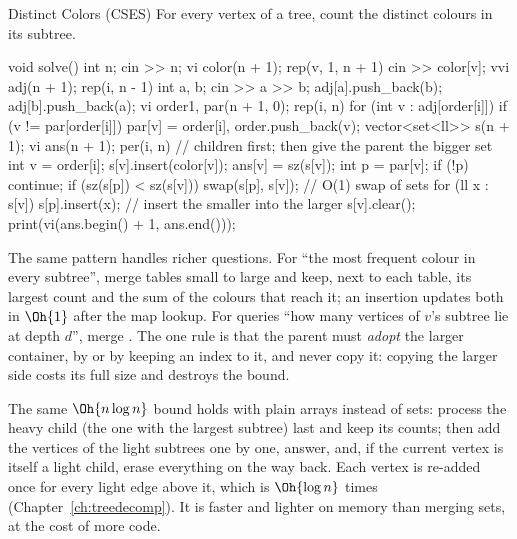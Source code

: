 \begin{problem}{Distinct Colors (CSES)}
For every vertex of a tree, count the distinct colours in its subtree.
\end{problem}

\begin{code}
void solve() {
    int n;
    cin >> n;
    vi color(n + 1);
    rep(v, 1, n + 1) cin >> color[v];
    vvi adj(n + 1);
    rep(i, n - 1) {
        int a, b;
        cin >> a >> b;
        adj[a].push_back(b);
        adj[b].push_back(a);
    }
    vi order{1}, par(n + 1, 0);
    rep(i, n) for (int v : adj[order[i]])
        if (v != par[order[i]]) par[v] = order[i], order.push_back(v);
    vector<set<ll>> s(n + 1);
    vi ans(n + 1);
    per(i, n) {  // children first; then give the parent the bigger set
        int v = order[i];
        s[v].insert(color[v]);
        ans[v] = sz(s[v]);
        int p = par[v];
        if (!p) continue;
        if (sz(s[p]) < sz(s[v])) swap(s[p], s[v]);  // O(1) swap of sets
        for (ll x : s[v]) s[p].insert(x);  // insert the smaller into the larger
        s[v].clear();
    }
    print(vi(ans.begin() + 1, ans.end()));
}
\end{code}


The same pattern handles richer questions. For ``the most frequent colour in every subtree'', merge 
tables small to large and keep, next to each table, its largest count and the sum of the colours that reach it; an insertion
updates both in $\Oh{1}$ after the map lookup. For queries ``how many vertices of $v$'s subtree lie at depth $d$'', merge
. The one rule is that the parent must \emph{adopt} the larger container, by  or by keeping an
index to it, and never copy it: copying the larger side costs its full size and destroys the bound.

\begin{trick}
The same $\Oh{n \log n}$ bound holds with plain arrays instead of sets: process the heavy child (the one with the largest subtree)
last and keep its counts; then add the vertices of the light subtrees one by one, answer, and, if the current vertex is itself a
light child, erase everything on the way back. Each vertex is re-added once for every light edge above it, which is $\Oh{\log n}$
times (Chapter~\ref{ch:treedecomp}). It is faster and lighter on memory than merging sets, at the cost of more code.
\end{trick}

